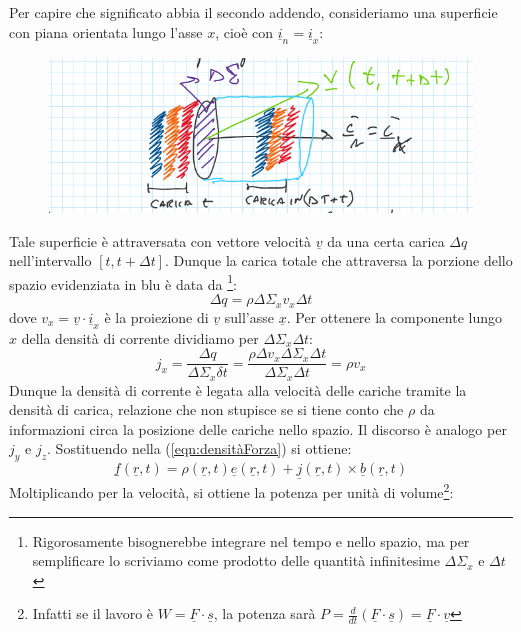 \documentclass{book}
\begin{document}
        Per capire che significato abbia il secondo addendo, consideriamo una superficie con piana orientata lungo l'asse $x$, cioè con $\underline{i}_{n} = \underline{i}_{x}$:
        \begin{figure}[h!]
            \includegraphics[width=0.6\linewidth]{img/Chapter_one/Chapt1img9.png}
        \end{figure}
        Tale superficie è attraversata con vettore velocità $\underline{v}$ da una certa carica $\Delta q$ nell'intervallo $[t, t+\Delta t]$.
        Dunque la carica totale che attraversa la porzione dello spazio evidenziata in blu è data da
        \footnote{Rigorosamente bisognerebbe integrare nel tempo e nello spazio, ma per semplificare lo scriviamo come prodotto delle quantità infinitesime $\Delta \Sigma_{x}$ e $\Delta t$}:
        \begin{equation}
            \Delta q = \rho \Delta \Sigma_{x}v_{x}\Delta t
        \end{equation}
        dove $v_{x} = \underline{v} \cdot \underline{i}_{x}$ è la proiezione di $\underline{v}$ sull'asse $\underline{x}$. Per ottenere la componente lungo $x$ della densità di corrente dividiamo per $\Delta \Sigma_{x}\Delta t$:
        \begin{equation}
                j_{x}=\frac{\Delta q}{\Delta \Sigma_{x}\delta t} = \frac{\rho \Delta v_{x}\Delta \Sigma_{x}\Delta t}{\Delta \Sigma_{x}\Delta t}=\rho v_{x}
        \end{equation}
        Dunque la densità di corrente è legata alla velocità delle cariche tramite la densità di carica, relazione che non stupisce se si tiene conto che $\rho$ da informazioni circa la posizione delle cariche nello spazio.
        Il discorso è analogo per $j_{y}$ e $j_{z}$. Sostituendo nella (\ref{eqn:densitàForza}) si ottiene:
        \begin{equation}
            \underline{f}(\underline{r},t)=\rho(\underline{r},t)\underline{e}(\underline{r},t)+\underline{j}(\underline{r},t)\times \underline{b}(\underline{r},t)
        \end{equation}
        Moltiplicando per la velocità, si ottiene la potenza per unità di volume\footnote{Infatti se il lavoro è $W=\underline{F} \cdot \underline{s}$, la potenza sarà $P= \frac{d}{dt}(\underline{F}\cdot \underline{s})=\underline{F}\cdot \underline{v}$}:
\end{document}
